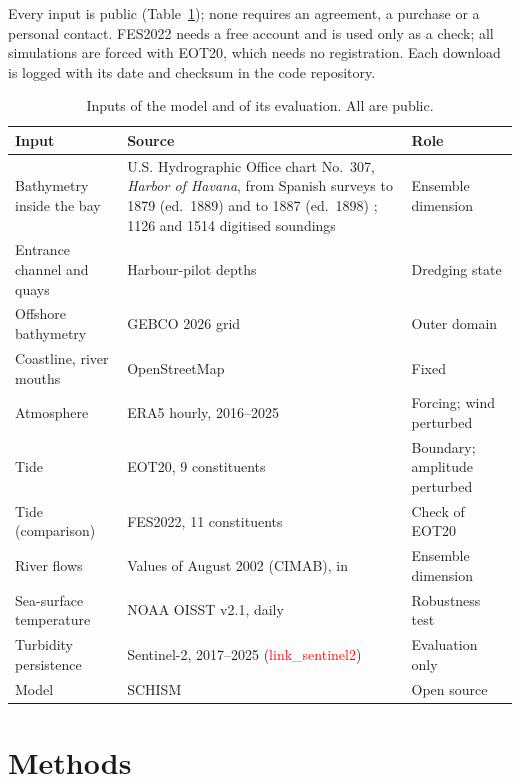 \documentclass[a4paper,fleqn]{ems-dc}
\newcommand{\ph}[1]{\textcolor{red}{\textsf{#1}}}
\begin{document}
Every input is public (Table~\ref{tab:data}); none requires an agreement, a purchase or a
personal contact. FES2022 needs a free account and is used only as a check; all simulations
are forced with EOT20, which needs no registration. Each download is logged with its date
and checksum in the code repository.

\begin{table}[!t]
\centering\small
\caption{Inputs of the model and of its evaluation. All are public.}\label{tab:data}
\begin{tabular}{p{3.0cm}p{9.8cm}p{4.0cm}}
\toprule
Input & Source & Role\\
\midrule
Bathymetry inside the bay & U.S. Hydrographic Office chart No.~307, \emph{Harbor of
Havana}, from Spanish surveys to 1879 (ed.~1889) and to 1887 (ed.~1898)
\citep{USHO1889,USHO1898}; 1126 and 1514 digitised soundings & Ensemble dimension\\
Entrance channel and quays & Harbour-pilot depths \citep{Practicos2018} & Dredging state\\
Offshore bathymetry & GEBCO 2026 grid \citep{GEBCO2026} & Outer domain\\
Coastline, river mouths & OpenStreetMap \citep{OSM} & Fixed\\
Atmosphere & ERA5 hourly, 2016--2025 \citep{Hersbach2020} & Forcing; wind perturbed\\
Tide & EOT20, 9 constituents \citep{HartDavis2021} & Boundary; amplitude perturbed\\
Tide (comparison) & FES2022, 11 constituents \citep{FES2022,Lyard2026} & Check of EOT20\\
River flows & Values of August 2002 (CIMAB), in \citet{JICA2004} & Ensemble dimension\\
Sea-surface temperature & NOAA OISST v2.1, daily \citep{Huang2021} & Robustness test\\
Turbidity persistence & Sentinel-2, 2017--2025 (\ph{link\_sentinel2}) &
Evaluation only\\
Model & SCHISM \citep{Zhang2016} & Open source\\
\bottomrule
\end{tabular}
\end{table}

\section{Methods}\label{sec:methods}
\end{document}
